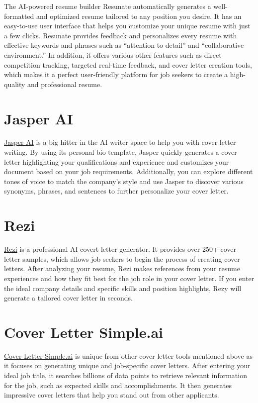 \documentclass[
]{book}
\begin{document}
The AI-powered resume builder Resunate automatically generates a well-formatted and optimized resume tailored to any position you desire. It has an easy-to-use user interface that helps you customize your unique resume with just a few clicks. Resunate provides feedback and personalizes every resume with effective keywords and phrases such as ``attention to detail'' and ``collaborative environment.'' In addition, it offers various other features such as direct competition tracking, targeted real-time feedback, and cover letter creation tools, which makes it a perfect user-friendly platform for job seekers to create a high-quality and professional resume.

\hypertarget{jasper-ai}{%
\section{Jasper AI}\label{jasper-ai}}

\href{https://www.jasper.ai/}{Jasper AI} is a big hitter in the AI writer space to help you with cover letter writing. By using its personal bio template, Jasper quickly generates a cover letter highlighting your qualifications and experience and customizes your document based on your job requirements. Additionally, you can explore different tones of voice to match the company's style and use Jasper to discover various synonyms, phrases, and sentences to further personalize your cover letter.

\hypertarget{rezi}{%
\section{Rezi}\label{rezi}}

\href{https://www.rezi.ai/}{Rezi} is a professional AI covert letter generator. It provides over 250+ cover letter samples, which allows job seekers to begin the process of creating cover letters. After analyzing your resume, Rezi makes references from your resume experiences and how they fit best for the job role in your cover letter. If you enter the ideal company details and specific skills and position highlights, Rezy will generate a tailored cover letter in seconds.~

\hypertarget{cover-letter-simple.ai}{%
\section{Cover Letter Simple.ai}\label{cover-letter-simple.ai}}

\href{https://coverlettersimple.ai/}{Cover Letter Simple.ai} is unique from other cover letter tools mentioned above as it focuses on generating unique and job-specific cover letters. After entering your ideal job title, it searches billions of data points to retrieve relevant information for the job, such as expected skills and accomplishments. It then generates impressive cover letters that help you stand out from other applicants.
\end{document}
